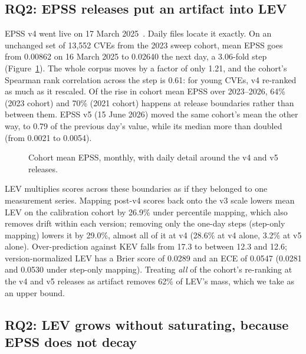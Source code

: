 \subsection{RQ2: EPSS releases put an artifact into LEV}\label{sec:res-version}

EPSS v4 went live on 17 March 2025~\cite{epss2026releases}. Daily files locate
it exactly. On an unchanged set of 13,552 CVEs from the 2023 sweep cohort, mean
EPSS goes from 0.00862 on 16 March 2025 to 0.02640 the next day, a 3.06-fold
step (Figure~\ref{fig:drift}). The whole corpus moves by a factor of only 1.21,
and the cohort's Spearman rank correlation across the step is 0.61: for young
CVEs, v4 re-ranked as much as it rescaled. Of the rise in cohort mean EPSS over
2023--2026, 64\% (2023 cohort) and 70\% (2021 cohort) happens at release
boundaries rather than between them. EPSS v5 (15 June 2026) moved the same
cohort's mean the other way, to 0.79 of the previous day's value, while its
median more than doubled (from 0.0021 to 0.0054).

\begin{figure}[t]
\centering
{}
\caption{Cohort mean EPSS, monthly, with daily detail around the v4 and v5
releases.}\label{fig:drift}
\end{figure}

LEV multiplies scores across these boundaries as if they belonged to one
measurement series. Mapping post-v4 scores back onto the v3 scale lowers mean
LEV on the calibration cohort by 26.9\% under percentile mapping, which also
removes drift within each version; removing only the one-day steps (step-only
mapping) lowers it by 29.0\%, almost all of it at v4 (28.6\% at v4 alone,
3.2\% at v5 alone). Over-prediction against KEV falls from 17.3 to between 12.3
and 12.6; version-normalized LEV has a Brier score of 0.0289 and an ECE of
0.0547 (0.0281 and 0.0530 under step-only mapping). Treating \emph{all} of the cohort's re-ranking at the v4 and v5
releases as artifact
removes 62\% of LEV's mass, which we take as an upper bound.


\subsection{RQ2: LEV grows without saturating, because EPSS does not decay}\label{sec:res-growth}

